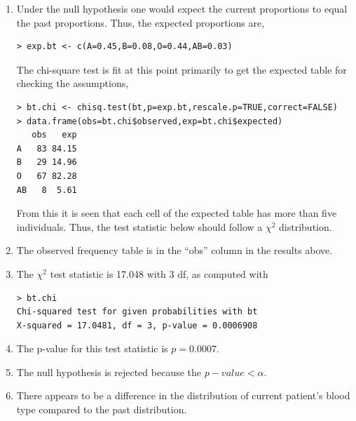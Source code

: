 \documentclass[10pt,openany]{book}\usepackage[]{graphicx}\usepackage[]{color}
\makeatletter
\newenvironment{kframe}{%
 \def\at@end@of@kframe{}%
 \ifinner\ifhmode%
  \def\at@end@of@kframe{\end{minipage}}%
  \begin{minipage}{\columnwidth}%
 \fi\fi%
 \def\FrameCommand##1{\hskip\@totalleftmargin \hskip-\fboxsep
 \colorbox{shadecolor}{##1}\hskip-\fboxsep
     \hskip-\linewidth \hskip-\@totalleftmargin \hskip\columnwidth}%
 \MakeFramed {\advance\hsize-\width
   \@totalleftmargin\z@ \linewidth\hsize
   \@setminipage}}%
 {\par\unskip\endMakeFramed%
 \at@end@of@kframe}
\newenvironment{knitrout}{}{} %
\makeatother
\begin{document}
\begin{itemize}
\begin{enumerate}
\begin{knitrout}
\end{knitrout}
      \item Under the null hypothesis one would expect the current proportions to equal the past proportions.  Thus, the expected proportions are,
\begin{knitrout}
\color{fgcolor}\begin{kframe}
\begin{verbatim}
> exp.bt <- c(A=0.45,B=0.08,O=0.44,AB=0.03)
\end{verbatim}
\end{kframe}
\end{knitrout}
The chi-square test is fit at this point primarily to get the expected table for checking the assumptions,
\begin{knitrout}
\color{fgcolor}\begin{kframe}
\begin{verbatim}
> bt.chi <- chisq.test(bt,p=exp.bt,rescale.p=TRUE,correct=FALSE)
> data.frame(obs=bt.chi$observed,exp=bt.chi$expected)
   obs   exp
A   83 84.15
B   29 14.96
O   67 82.28
AB   8  5.61
\end{verbatim}
\end{kframe}
\end{knitrout}
From this it is seen that each cell of the expected table has more than five individuals.  Thus, the test statistic below should follow a $\chi^{2}$ distribution.
      \item The observed frequency table is in the ``obs'' column in the results above.
      \item The $\chi^{2}$ test statistic is 17.048 with 3 df, as computed with
\begin{knitrout}
\color{fgcolor}\begin{kframe}
\begin{verbatim}
> bt.chi
Chi-squared test for given probabilities with bt 
X-squared = 17.0481, df = 3, p-value = 0.0006908
\end{verbatim}
\end{kframe}
\end{knitrout}
      \item The p-value for this test statistic is $p=0.0007$.
      \item The null hypothesis is rejected because the $p-value<\alpha$.
      \item There appears to be a difference in the distribution of current patient's blood type compared to the past distribution.

\end{enumerate}
\end{itemize}
\end{document}
